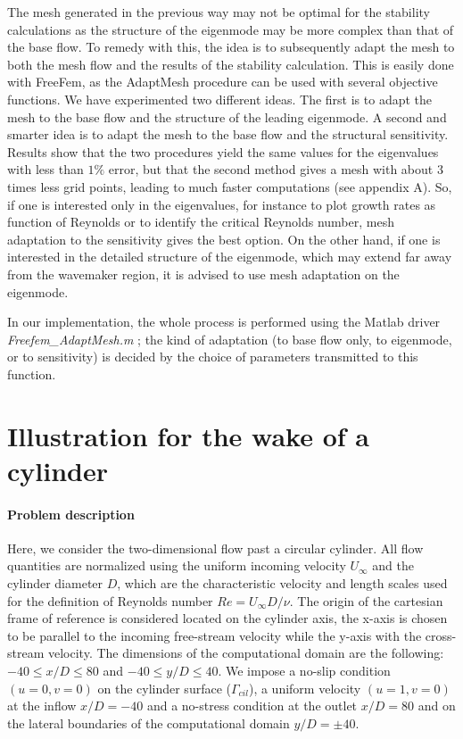 \documentclass[twocolumn,10pt]{asme2ej}
\begin{document}
The mesh generated in the previous way may not be optimal for the stability calculations as the structure of the eigenmode may be more complex than that of the base flow. To remedy with this, the idea is to subsequently adapt the mesh to both the mesh flow and the results of the stability calculation. This is easily done with FreeFem, as the  AdaptMesh procedure can be used with several objective functions. We have experimented two different ideas. The first is to adapt the mesh to the base flow and the structure of the leading eigenmode. A second and smarter idea is to adapt the mesh to the base flow and the structural sensitivity. Results show that the two procedures yield the same values for the eigenvalues with less than $1\%$ error, but that the second method gives a mesh with about 3 times less grid points, leading to much faster computations (see appendix A). So, if one is interested only in the eigenvalues, for instance to plot growth rates as function of Reynolds or to identify the critical Reynolds number, mesh adaptation to the sensitivity gives the best option. On the other hand, if one is interested in the detailed structure of the eigenmode, which may extend far away from the wavemaker region, it is advised to use mesh adaptation on the eigenmode. 

In our implementation, the whole process is performed using the Matlab driver {\em Freefem\_AdaptMesh.m} ; the kind of adaptation  (to base flow only, to eigenmode, or to sensitivity) is decided by the choice of parameters transmitted to this function.






\section{Illustration for the wake of a cylinder} 
\vspace{.2cm}

\paragraph{Problem description}
Here, we consider the two-dimensional flow past a circular cylinder. All flow quantities are normalized using 
the uniform incoming velocity $U_{\infty}$ and the cylinder diameter $D$, which are the characteristic velocity and 
length scales used for the definition of Reynolds number $Re= U_{\infty} D / \nu$.
The origin of the cartesian frame of reference is considered located on the cylinder axis, the x-axis is chosen to be parallel to the incoming free-stream velocity while the y-axis with the cross-stream velocity.
The dimensions of the computational domain are the following: $-40 \le x/D \le 80$ and $-40 \le y/D \le 40$.
We impose a no-slip condition $(u=0,v=0)$ on the cylinder surface (${\Gamma_{cil}}$), a uniform velocity $(u=1,v=0)$ at the inflow 
$x/D=-40$ and a no-stress condition at the outlet $x/D=80$ and on the lateral boundaries of the computational domain $y/D=\pm 40$.
\end{document}
